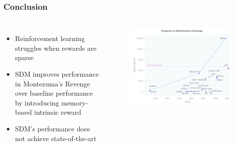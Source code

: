 \documentclass{beamer}
\begin{document}
\begin{frame}[shrink]
  \frametitle{Conclusion}
  \begin{columns}
    \begin{itemize}
      \small
      \item Reinforcement learning struggles when rewards are sparse
      \item SDM improves performance in Montezuma's Revenge over baseline performance by introducing memory-based intrinsic reward
      \item SDM's performance does not achieve state-of-the-art
    \end{itemize}
    \begin{figure}
      \includegraphics[scale=0.25]{assets/progress.png}
    \end{figure}
  \end{columns}
\end{frame}
\end{document}
